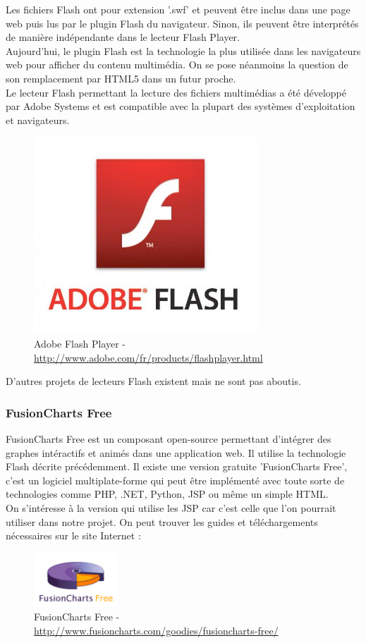 Les fichiers Flash ont pour extension '.swf' et peuvent être inclus dans une page web puis lus par le plugin Flash du navigateur. Sinon, ils peuvent être interprétés de manière indépendante dans le lecteur Flash Player.\\
Aujourd'hui, le plugin Flash est la technologie la plus utilisée dans les navigateurs web pour afficher du contenu multimédia. On se pose néanmoins la question de son remplacement par HTML5 dans un futur proche.\\
Le lecteur Flash permettant la lecture des fichiers multimédias a été développé par Adobe Systems et est compatible avec la plupart des systèmes d'exploitation et navigateurs.
\begin{figure}[H]
  \center
  \includegraphics[scale=0.4]{../graph/flashAdobe.jpg}
  \caption{Adobe Flash Player - \url{http://www.adobe.com/fr/products/flashplayer.html}}
\end{figure}
D'autres projets de lecteurs Flash existent mais ne sont pas aboutis.

\subsubsection{FusionCharts Free}
FusionCharts Free est un composant open-source permettant d'intégrer des graphes intéractifs et animés dans une application web. Il utilise la technologie Flash décrite précédemment. Il existe une version gratuite 'FusionCharts Free', c'est un logiciel multiplate-forme qui peut être implémenté avec toute sorte de technologies comme PHP, .NET, Python, JSP ou même un simple HTML.\\

On s'intéresse à la version qui utilise les JSP car c'est celle que l'on pourrait utiliser dans notre projet.
On peut trouver les guides et téléchargements nécessaires sur le site Internet :
\begin{figure}[H]
  \center
  \includegraphics[scale=0.8]{../graph/fusionCharts.png}
  \caption{FusionCharts Free - \url{http://www.fusioncharts.com/goodies/fusioncharts-free/}}
\end{figure}


